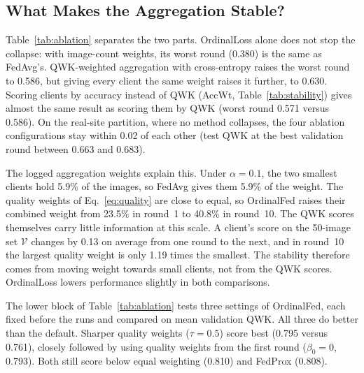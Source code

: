 \subsection{What Makes the Aggregation Stable?}

Table~\ref{tab:ablation} separates the two parts. OrdinalLoss alone does not stop
the collapse: with image-count weights, its worst round (0.380) is the same as
FedAvg's. QWK-weighted aggregation with cross-entropy raises the worst round to
0.586, but giving every client the same weight raises it further, to 0.630. Scoring
clients by accuracy instead of QWK (AccWt, Table~\ref{tab:stability}) gives almost
the same result as scoring them by QWK (worst round 0.571 versus 0.586). On the
real-site partition, where no method collapses, the four ablation configurations
stay within 0.02 of each other (test QWK at the best validation round between 0.663
and 0.683).

The logged aggregation weights explain this. Under $\alpha=0.1$, the two smallest
clients hold 5.9\% of the images, so FedAvg gives them 5.9\% of the weight. The
quality weights of Eq.~\eqref{eq:quality} are close to equal, so OrdinalFed raises
their combined weight from 23.5\% in round~1 to 40.8\% in round~10. The QWK scores
themselves carry little information at this scale. A client's score on the
50-image set $\mathcal{V}$ changes by 0.13 on average from one round to the next,
and in round~10 the largest quality weight is only 1.19 times the smallest. The
stability therefore comes from moving weight towards small clients, not from the
QWK scores. OrdinalLoss lowers performance slightly in both comparisons.

The lower block of Table~\ref{tab:ablation} tests three settings of OrdinalFed,
each fixed before the runs and compared on mean validation QWK. All three do
better than the default. Sharper quality weights ($\tau=0.5$) score best (0.795
versus 0.761), closely followed by using quality weights from the first round
($\beta_0=0$, 0.793). Both still score below equal weighting (0.810) and FedProx
(0.808).


